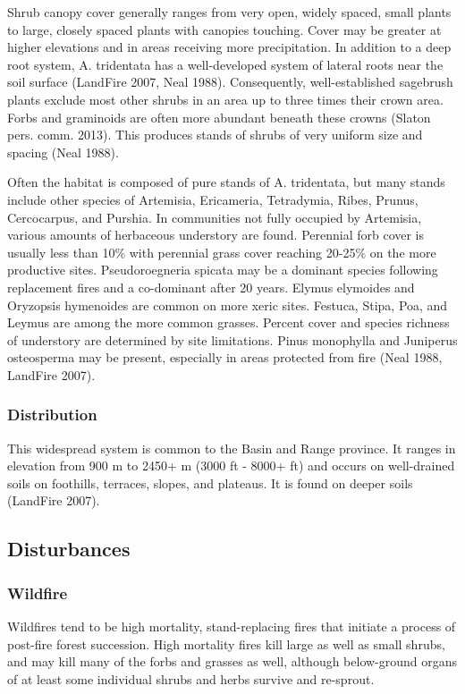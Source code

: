Shrub canopy cover generally ranges from very open, widely spaced, small plants to large, closely spaced plants with canopies touching. Cover may be greater at higher elevations and in areas receiving more precipitation. In addition to a deep root system, A. tridentata has a well-developed system of lateral roots near the soil surface (LandFire 2007, Neal 1988). Consequently, well-established sagebrush plants exclude most other shrubs in an area up to three times their crown area. Forbs and graminoids are often more abundant beneath these crowns (Slaton pers. comm. 2013). This produces stands of shrubs of very uniform size and spacing (Neal 1988).

Often the habitat is composed of pure stands of A. tridentata, but many stands include other species of Artemisia, Ericameria, Tetradymia, Ribes, Prunus, Cercocarpus, and Purshia. In communities not fully occupied by Artemisia, various amounts of herbaceous understory are found. Perennial forb cover is usually less than 10\% with perennial grass cover reaching 20-25\% on the more productive sites. Pseudoroegneria spicata may be a dominant species following replacement fires and a co-dominant after 20 years. Elymus elymoides and Oryzopsis hymenoides are common on more xeric sites. Festuca, Stipa, Poa, and Leymus are among the more common grasses. Percent cover and species richness of understory are determined by site limitations. Pinus monophylla and Juniperus osteosperma may be present, especially in areas protected from fire (Neal 1988, LandFire 2007).


\subsubsection{Distribution}
This widespread system is common to the Basin and Range province. It ranges in elevation from 900 m to 2450+ m (3000 ft - 8000+ ft) and occurs on well-drained soils on foothills, terraces, slopes, and plateaus. It is found on deeper soils (LandFire 2007).

\subsection*{Disturbances}


\subsubsection{Wildfire}
Wildfires tend to be high mortality, stand-replacing fires that initiate a process of post-fire forest succession. High mortality fires kill large as well as small shrubs, and may kill many of the forbs and grasses as well, although below-ground organs of at least some individual shrubs and herbs survive and re-sprout. 

